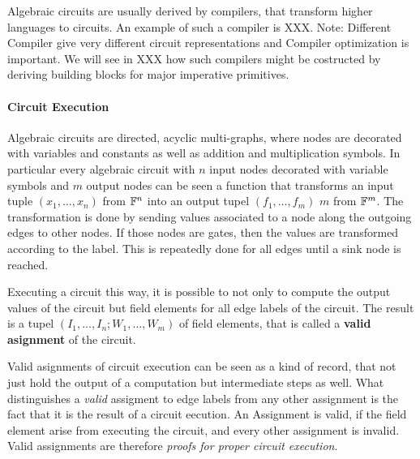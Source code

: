 Algebraic circuits are usually derived by compilers, that transform  higher languages to circuits. An example of such a compiler is XXX. Note: Different Compiler give very different circuit representations and Compiler optimization is important. We will see in XXX how such compilers might be costructed by deriving building blocks for major imperative primitives.
\paragraph{Circuit Execution} Algebraic circuits are directed, acyclic multi-graphs, where nodes are decorated with variables and constants as well as addition and multiplication symbols. In particular every algebraic circuit with $n$ input nodes decorated with variable symbols and $m$ output nodes can be seen a function that transforms an input tuple $(x_1,\ldots, x_n)$ from $\mathbb{F}^n$ into an output tupel $(f_1,\ldots,f_m)$ $m$ from $\mathbb{F}^m$. The transformation is done by sending values associated to a node along the outgoing edges to other nodes. If those nodes are gates, then the values are transformed according to the label. This is repeatedly done for all edges until a sink node is reached.

Executing a circuit this way, it is possible to not only to compute the output values of the circuit but field elements for all edge labels of the circuit. The result is a tupel $(I_1,\ldots,I_n; W_1,\ldots,W_m)$ of field elements, that is called a \textbf{valid asignment} of the circuit. 

Valid asignments of circuit execution can be seen as a kind of record, that not just hold the output of a computation but intermediate steps as well. What distinguishes a \textit{valid} assigment to edge labels from any other assignment is the fact that it is the result of a circuit eecution. An Assignment is valid, if the field element arise from executing the circuit, and every other assignment is invalid. Valid assignments are therefore \textit{proofs for proper circuit execution}.

